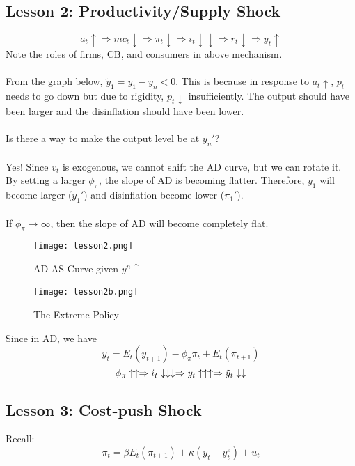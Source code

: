 \documentclass{article}
\begin{document}
\subsection{Lesson 2: Productivity/Supply Shock}
$$a_t \uparrow \Rightarrow mc_t \downarrow \Rightarrow \pi_t \downarrow\Rightarrow i_t \downarrow\downarrow \Rightarrow r_t \downarrow \Rightarrow y_t \uparrow$$
\noindent Note the roles of firms, CB, and consumers in above mechanism.\\
\\
From the graph below, $\tilde{y}_1 = y_1 - y_n < 0$. This is because in response to $a_t\uparrow$, $p_t$ needs to go down but due to rigidity, $p_t\downarrow$ insufficiently. The output should have been larger and the disinflation should have been lower.\\
\\
Is there a way to make the output level be at $y_n'$? \\
\\
Yes! Since $v_t$ is exogenous, we cannot shift the AD curve, but we can rotate it. By setting a larger $\phi_\pi$, the slope of AD is becoming flatter. Therefore, $y_1$ will become larger ($y_1'$) and disinflation become lower ($\pi_1'$).\\
\\
If $\phi_\pi \rightarrow \infty$, then the slope of AD will become completely flat.\\
\begin{figure}[h!]
    \centering
    \texttt{[image: lesson2.png]}
    \caption{AD-AS Curve given $y^n \uparrow$}
    \label{fig:enter-label}
\end{figure}

\begin{figure}[h!]
    \centering
    \texttt{[image: lesson2b.png]}
    \caption{The Extreme Policy}
    \label{fig:enter-label}
\end{figure}

\noindent Since in AD, we have
$$y_t = E_t(y_{t+1}) - \phi_\pi \pi_t + E_t (\pi_{t+1})$$
$$\phi_\pi \uparrow\uparrow \Rightarrow i_t \downarrow \downarrow \downarrow \Rightarrow y_t \uparrow\uparrow\uparrow \Rightarrow \Tilde{y}_t \downarrow\downarrow$$





\subsection{Lesson 3: Cost-push Shock}
Recall:
$$\pi_t = \beta E_t(\pi_{t+1}) + \kappa (y_t - y_t^e) + u_t$$
\end{document}
